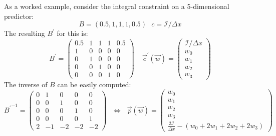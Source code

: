 \documentclass[]{article}
\begin{document}
					As a worked example, consider the integral constraint on a 5-dimensional predictor:
					\begin{equation}
						B = (0.5,1,1,1,0.5)~~~c = \mathcal{I}/\Delta x
					\end{equation}
					The resulting $B^\prime$ for this is:
					\begin{equation}
						B^\prime = \begin{pmatrix}
							0.5 & 1 & 1 & 1 & 0.5
							\\
							1 & 0 & 0 & 0 & 0
							\\
							0 & 1 & 0 & 0 & 0
							\\
							0 & 0 & 1 & 0 & 0
							\\
							0 & 0 & 0 & 1 & 0
						\end{pmatrix}
						~~~~~\vec{c}^\prime(\vec{w}) = \begin{pmatrix}
							\mathcal{I}/\Delta x
							\\
							w_0
							\\
							w_1
							\\
							w_2
							\\
							w_3
						\end{pmatrix}
					\end{equation}
					The inverse of $B$ can be easily computed:
					\begin{equation}
						{B^\prime}^{-1} = \begin{pmatrix} 0 & 1 & 0 & 0 & 0
							\\
							0 & 0 & 1 & 0 & 0
							\\
							0 & 0 & 0 & 1 & 0
							\\
							0 & 0 & 0 & 0 & 1
							\\
							2 & -1 & -2 & -2 & -2\end{pmatrix} ~~~\Longleftrightarrow~~~\vec{p}(\vec{w}) = \begin{pmatrix}
								w_0
								\\
								w_1
								\\
								w_2
								\\
								w_3
								\\
								\frac{2\mathcal{I}}{\Delta x} - (w_0 + 2 w_1 + 2w_2 + 2w_3)
							\end{pmatrix}
					\end{equation}
					
\end{document}
